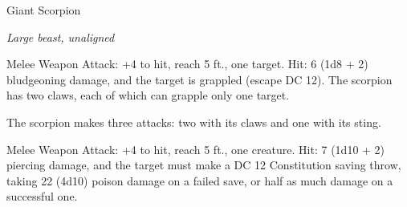 \begin{monsterbox}{Giant Scorpion}
\begin{hangingpar}
\textit{Large beast, unaligned}
\end{hangingpar}
\dndline%
\basics[%
armorclass = 15,
hitpoints = 7d10 + 14,
speed = {40 ft.}
]
\dndline%
\stats[%
STR = \stat{15},
DEX = \stat{13},
CON = \stat{15},
INT = \stat{1},
WIS = \stat{9},
CHA = \stat{3}
]
\dndline%
\details[%
skills={},
damageimmunities={},
savingthrows={},
conditionimmunities={},
damageresistances={},
damagevulnerabilities={},
senses={blindsight 60 ft., passive Perception 9},
challenge=3
]
\dndline%
\begin{monsteraction}[Claw]
Melee Weapon Attack: +4 to hit, reach 5 ft., one target. Hit: 6 (1d8 + 2) bludgeoning damage, and the target is grappled (escape DC 12). The scorpion has two claws, each of which can grapple only one target.
\end{monsteraction}
\begin{monsteraction}[Multiattack]
The scorpion makes three attacks: two with its claws and one with its sting.
\end{monsteraction}
\begin{monsteraction}[Sting]
Melee Weapon Attack: +4 to hit, reach 5 ft., one creature. Hit: 7 (1d10 + 2) piercing damage, and the target must make a DC 12 Constitution saving throw, taking 22 (4d10) poison damage on a failed save, or half as much damage on a successful one.
\end{monsteraction}
\end{monsterbox}